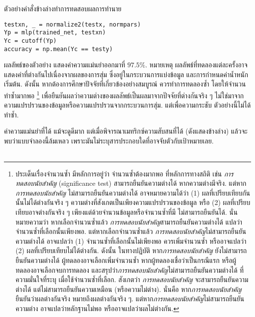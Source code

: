\begin{Exercise}
ตัวอย่างคำสั่งข้างล่างทำการทดสอบผลการทำนาย
\begin{Verbatim}[fontsize=\small]
testxn, _ = normalize2(testx, normpars)
Yp = mlp(trained_net, testxn)
Yc = cutoff(Yp)
accuracy = np.mean(Yc == testy)
\end{Verbatim}
ผลลัพธ์ของตัวอย่าง แสดงค่าความแม่นยำออกมาที่ $97.5\%$.
หมายเหตุ ผลลัพธ์ที่ทดลองแต่ละครั้งอาจแสดงค่าที่ต่างกันไปเนื่องจากผลของการสุ่ม ซึ่งอยู่ในกระบวนการแบ่งข้อมูล และการกำหนดค่าน้ำหนักเริ่มต้น.
ดังนั้น หากต้องการศึกษาปัจจัยที่เกี่ยวข้องอย่างสมบูรณ์ ควรทำการทดลองซ้ำ โดยให้จำนวนทำซ้ำมากพอ%
\footnote{%
ประเด็นเรื่องจำนวนซ้ำ 
มีหลักการอยู่ว่า
จำนวนซ้ำต้องมากพอ ที่หลักการทางสถิติ เช่น \textit{การทดสอบนัยสำคัญ} (significance test) สามารถยืนยันความต่างได้ หากความต่างมีจริง.
แต่หาก\textit{การทดสอบนัยสำคัญ} ไม่สามารถยืนยันความต่างได้
อาจหมายความได้ว่า (1) ผลที่เปรียบเทียบกันนั้นไม่ได้ต่างกันจริง ๆ ความต่างที่สังเกตเป็นเพียงความแปรปรวนของข้อมูล
หรือ (2) ผลที่เปรียบเทียบอาจต่างกันจริง ๆ เพียงแต่ด้วยจำนวนข้อมูลหรือจำนวนซ้ำที่มี ไม่สามารถยืนยันได้.
นั่นหมายความว่า
หากเลือกจำนวนซ้ำแล้ว \textit{การทดสอบนัยสำคัญ}สามารถยืนยันความต่างได้ แปลว่าจำนวนซ้ำที่เลือกนั้นเพียงพอ.
แต่หากเลือกจำนวนซ้ำแล้ว \textit{การทดสอบนัยสำคัญ}ไม่สามารถยืนยันความต่างได้
อาจแปลว่า (1) จำนวนซ้ำที่เลือกนั้นไม่เพียงพอ ควรเพิ่มจำนวนซ้ำ หรืออาจแปลว่า (2) ผลที่เปรียบเทียบไม่ได้ต่างกัน.
ดังนั้น ในทางปฏิบัติ หาก\textit{การทดสอบนัยสำคัญ} ยังไม่สามารถยืนยันความต่างได้ ผู้ทดลองอาจเลือกเพิ่มจำนวนซ้ำ หากผู้ทดลองเชื่อว่าเป็นกรณีแรก หรือผู้ทดลองอาจเลือกจบการทดลอง และสรุปว่า\textit{การทดสอบนัยสำคัญ}ไม่สามารถยืนยันความต่างได้
ที่ความมั่นใจที่ระบุ เมื่อใช้จำนวนซ้ำที่เลือก.
สังเกตว่า \textit{การทดสอบนัยสำคัญ} จะสามารถยืนยันความต่างได้ แต่ไม่สามารถยืนยันความเหมือน (หรือความไม่ต่าง).
นั่นคือ หาก\textit{การทดสอบนัยสำคัญ}ยืนยันว่าผลต่างกันจริง หมายถึงผลต่างกันจริง ๆ.
แต่หาก\textit{การทดสอบนัยสำคัญ}ไม่สามารถยืนยันความต่าง อาจแปลว่าหลักฐานไม่พอ หรืออาจแปลว่าผลไม่ต่างกัน.
}
เพื่อยืนยันผลว่าความต่างของผลลัพธ์เป็นผลมาจากปัจจัยที่ต่างกันจริง ๆ ไม่ใช่มาจากความแปรปรวนของข้อมูลหรือความแปรปรวนจากกระบวนการสุ่ม.
แต่เพื่อความกระชับ ตัวอย่างนี้ไม่ได้ทำซ้ำ.

ค่าความแม่นยำที่ได้ แม้จะดูดีมาก
แต่เมื่อพิจารณาเมทริกซ์ความสับสนที่ได้ (ดังแสดงข้างล่าง) 
แล้วจะพบว่าแบบจำลองนี้ล้มเหลว
เพราะมันไม่ระบุสารประกอบใดที่อาจจับตัวกับเป้าหมายเลย.
%
\begin{center}
	\begin{tabular}{cccc}
		

\end{tabular}
\end{center}
\end{Exercise}

